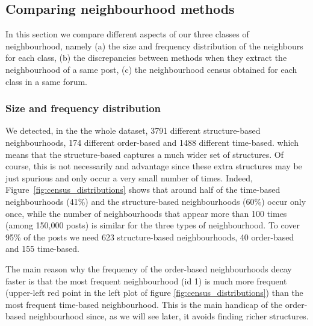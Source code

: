 \documentclass[conference]{IEEEtran}
\begin{document}
\subsection{Comparing neighbourhood methods}
In this section we compare different aspects of our three classes of neighbourhood, namely (a) the size and frequency distribution of the neighbours for each class, (b) the discrepancies between methods when they extract the neighbourhood of a same post, (c) the neighbourhood census obtained for each class in a same forum. 

\subsubsection{Size and frequency distribution}
We detected, in the the whole dataset, 3791 different structure-based neighbourhoods, 174 different order-based and 1488 different time-based. which means that the structure-based captures a much wider set of structures. Of course, this is not necessarily and advantage since these extra structures may be just spurious and only occur a very small number of times. Indeed, Figure~\ref{fig:census_distributions} shows that around half of the time-based neighbourhoods (41\%) and the structure-based neighbourhoods (60\%) occur only once, while the number of neighbourhoods that appear more than 100 times (among 150,000 posts) is similar for the three  types of neighbourhood. To cover 95\% of the posts we need 623 structure-based neighbourhoods, 40 order-based and 155 time-based. 
 
The main reason why the frequency of the order-based neighbourhoods decay faster is that the most frequent neighbourhood (id 1) is much more frequent (upper-left red point in the left plot of figure \ref{fig:census_distributions}) than the most frequent time-based neighbourhood. This is the main handicap of the order-based neighbourhood since, as we will see later, it avoids finding richer structures.
\end{document}
